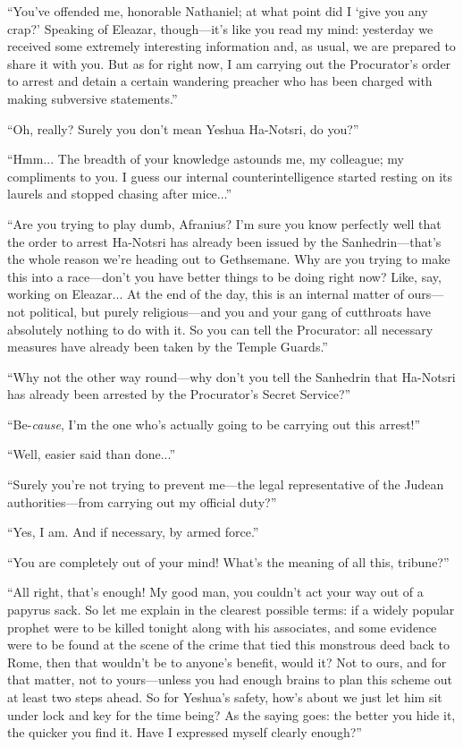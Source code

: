 ``You've offended me, honorable Nathaniel; at what point did I `give you any crap?' Speaking of Eleazar, though---it's like you read my mind: yesterday we received some extremely interesting information and, as usual, we are prepared to share it with you. But as for right now, I am carrying out the Procurator's order to arrest and detain a certain wandering preacher who has been charged with making subversive statements.''

``Oh, really? Surely you don't mean Yeshua Ha-Notsri, do you?''

``Hmm... The breadth of your knowledge astounds me, my colleague; my compliments to you. I guess our internal counterintelligence started resting on its laurels and stopped chasing after mice...''

``Are you trying to play dumb, Afranius? I'm sure you know perfectly well that the order to arrest Ha-Notsri has already been issued by the Sanhedrin---that's the whole reason we're heading out to Gethsemane. Why are you trying to make this into a race---don't you have better things to be doing right now? Like, say, working on Eleazar... At the end of the day, this is an internal matter of ours---not political, but purely religious---and you and your gang of cutthroats have absolutely nothing to do with it. So you can tell the Procurator: all necessary measures have already been taken by the Temple Guards.''

``Why not the other way round---why don't you tell the Sanhedrin that Ha-Notsri has already been arrested by the Procurator's Secret Service?''

``Be-\emph{cause}, I'm the one who's actually going to be carrying out this arrest!''

``Well, easier said than done...''

``Surely you're not trying to prevent me---the legal representative of the Judean authorities---from carrying out my official duty?''

``Yes, I am. And if necessary, by armed force.''

``You are completely out of your mind! What's the meaning of all this, tribune?''

``All right, that's enough! My good man, you couldn't act your way out of a papyrus sack. So let me explain in the clearest possible terms: if a widely popular prophet were to be killed tonight along with his associates, and some evidence were to be found at the scene of the crime that tied this monstrous deed back to Rome, then that wouldn't be to anyone's benefit, would it? Not to ours, and for that matter, not to yours---unless you had enough brains to plan this scheme out at least two steps ahead. So for Yeshua's safety, how's about we just let him sit under lock and key for the time being? As the saying goes: the better you hide it, the quicker you find it. Have I expressed myself clearly enough?''

